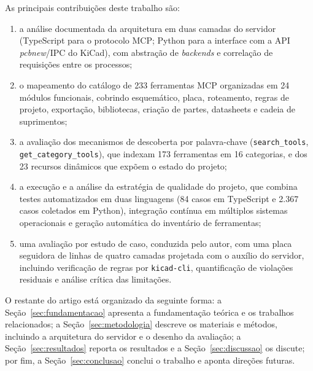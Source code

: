 As principais contribuições deste trabalho são:

\begin{enumerate}[leftmargin=1.4em,itemsep=0.25em]
  \item a análise documentada da arquitetura em duas camadas do servidor
        (TypeScript para o protocolo MCP; Python para a interface com a API
        \emph{pcbnew}/IPC do KiCad), com abstração de \emph{backends} e
        correlação de requisições entre os processos;
  \item o mapeamento do catálogo de 233 ferramentas MCP organizadas em 24
        módulos funcionais, cobrindo esquemático, placa, roteamento, regras de
        projeto, exportação, bibliotecas, criação de partes, datasheets e
        cadeia de suprimentos;
  \item a avaliação dos mecanismos de descoberta por palavra-chave
        (\texttt{search\_tools}, \texttt{get\_category\_tools}), que indexam
        173 ferramentas em 16 categorias, e dos 23 recursos dinâmicos que
        expõem o estado do projeto;
  \item a execução e a análise da estratégia de qualidade do projeto, que
        combina testes automatizados em duas linguagens (84 casos em
        TypeScript e 2.367 casos coletados em Python), integração contínua em
        múltiplos sistemas operacionais e geração automática do inventário de
        ferramentas;
  \item uma avaliação por estudo de caso, conduzida pelo autor, com uma placa
        seguidora de linhas de quatro camadas projetada com o auxílio do
        servidor, incluindo verificação de regras por \texttt{kicad-cli},
        quantificação de violações residuais e análise crítica das limitações.
\end{enumerate}

O restante do artigo está organizado da seguinte forma: a
Seção~\ref{sec:fundamentacao} apresenta a fundamentação teórica e os trabalhos
relacionados; a Seção~\ref{sec:metodologia} descreve os materiais e métodos,
incluindo a arquitetura do servidor e o desenho da avaliação; a
Seção~\ref{sec:resultados} reporta os resultados e a
Seção~\ref{sec:discussao} os discute; por fim, a
Seção~\ref{sec:conclusao} conclui o trabalho e aponta direções futuras.
